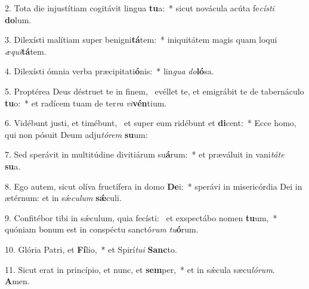 2. Tota die injustítiam cogitávit lingua \textbf{tu}a:~*  sicut novácula acúta fe\textit{cís}\textit{ti} \textbf{do}lum.\

3. Dilexísti malítiam super benigni\textbf{tá}tem:~*  iniquitátem magis quam loqui \textit{æ}\textit{qui}\textbf{tá}tem.\

4. Dilexísti ómnia verba præcipitati\textbf{ó}nis:~*  lin\textit{gua} \textit{do}\textbf{ló}sa.\

5. Proptérea Deus déstruet te in finem, \dag\  evéllet te, et emigrábit te de tabernáculo \textbf{tu}o:~*  et radícem tuam de ter\textit{ra} \textit{vi}\textbf{vén}tium.\

6. Vidébunt justi, et timébunt, \dag\  et super eum ridébunt et \textbf{di}cent:~*  Ecce homo, qui non pósuit Deum adju\textit{tó}\textit{rem} \textbf{su}um:\

7. Sed sperávit in multitúdine divitiárum su\textbf{á}rum:~*  et præváluit in vani\textit{tá}\textit{te} \textbf{su}a.\

8. Ego autem, sicut olíva fructífera in domo \textbf{De}i:~*  sperávi in misericórdia Dei in ætérnum: et in sǽ\textit{cu}\textit{lum} \textbf{sǽ}culi.\

9. Confitébor tibi in sǽculum, quia fecísti: \dag\  et exspectábo nomen \textbf{tu}um,~*  quóniam bonum est in conspéctu sanctó\textit{rum} \textit{tu}\textbf{ó}rum.\

10. Glória Patri, et \textbf{Fí}lio,~*  et Spirí\textit{tu}\textit{i} \textbf{Sanc}to.\

11. Sicut erat in princípio, et nunc, et \textbf{sem}per,~*  et in sǽcula sæcu\textit{ló}\textit{rum}. \textbf{A}men.\

